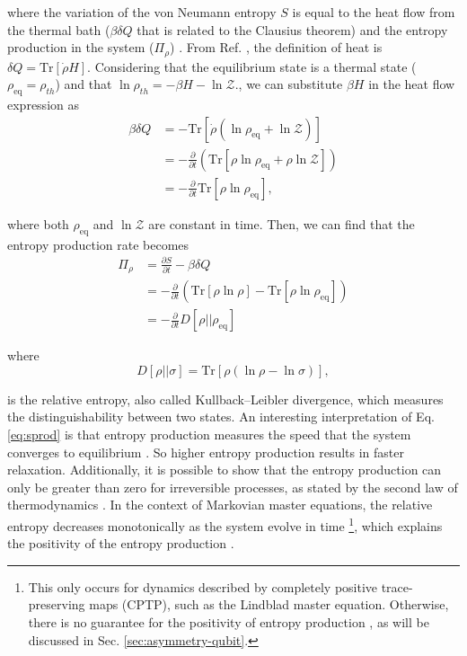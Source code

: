 \noindent where the variation of the von Neumann entropy $S$ is equal to the heat flow from the thermal bath ($ \beta \delta Q$ that is related to the Clausius theorem) and the entropy production in the system ($\Pi_\rho$) \cite{spohn-1978, landi-2021}. From Ref. \cite{alicki-2004}, the definition of heat is $\delta Q = \text{Tr}[\dot{\rho} H]$.  Considering that the equilibrium state is a thermal state ($\rho_{\text{eq}} = \rho_{th}$) and that $\ln \rho_{th} = -\beta H - \ln \mathcal{Z}$., we can substitute $\beta H$ in the heat flow expression as
\begin{equation}
    \begin{split}
        \beta \delta Q &= - \text{Tr}[\dot{\rho} (\ln \rho_{\text{eq}} + \ln \mathcal{Z})]\\
        &= - \frac{\partial}{\partial t}( \text{Tr}[\rho \ln \rho_{\text{eq}} + \rho \ln \mathcal{Z}] )\\
        &= - \frac{\partial}{\partial t} \text{Tr}[\rho \ln \rho_{\text{eq}}],
    \end{split}
\end{equation}

\noindent where both $\rho_{\text{eq}}$ and $\ln \mathcal{Z}$ are constant in time. Then, we can find that the entropy production rate becomes
\begin{equation}
    \begin{split}
        \Pi_\rho &= \frac{\partial S}{\partial t} - \beta \delta Q \\
        &= - \frac{\partial}{\partial t}(\text{Tr} [\rho \ln \rho] - \text{Tr}[\rho \ln \rho_{\text{eq}}])  \\
        &=- \frac{\partial}{\partial t} D [{\rho} || \rho_{\text{eq}}]
    \end{split}
    \label{eq:sprod}
\end{equation}

\noindent where
\begin{equation}
    D [\rho || \sigma] = \text{Tr}[{\rho} (\ln {\rho} - \ln \sigma)],
    \label{eq:relative-entropy}
\end{equation}

\noindent is the relative entropy, also called Kullback–Leibler divergence, which measures the distinguishability between two states. An interesting interpretation of Eq. \eqref{eq:sprod} is that entropy production measures the speed that the system converges to equilibrium \cite{tejero-misc-2025}. So higher entropy production results in faster relaxation. Additionally, it is possible to show that the entropy production can only be greater than zero for irreversible processes, as stated by the second law of thermodynamics \cite{landi-2021, tejero-misc-2025}. In the context of Markovian master equations, the relative entropy decreases monotonically as the system evolve in time \footnote{This only occurs for dynamics described by completely positive trace-preserving maps (CPTP), such as the Lindblad master equation. Otherwise, there is no guarantee for the positivity of entropy production \cite{giordano-2026}, as will be discussed in Sec. \ref{sec:asymmetry-qubit}.}, which explains the positivity of the entropy production \cite{giordano-2026}.

